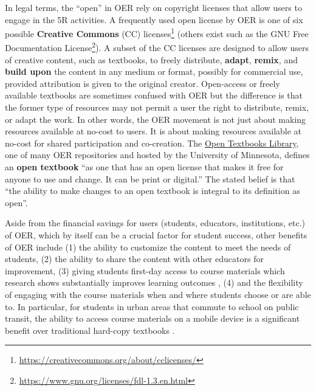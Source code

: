\documentclass[11pt]{article}
\begin{document}
In legal terms, the ``open'' in OER rely on copyright licenses that allow users to engage in the 5R activities.  A frequently used open license by OER is one of six possible \textbf{Creative Commons} (CC) licenses\footnote{\href{https://creativecommons.org/about/cclicenses/}{https://creativecommons.org/about/cclicenses/}} (others exist such as the GNU Free Documentation License\footnote{\href{https://www.gnu.org/licenses/fdl-1.3.en.html}{https://www.gnu.org/licenses/fdl-1.3.en.html}}).  A subset of the CC licenses are designed to allow users of creative content, such as textbooks, to freely distribute, \textbf{adapt}, \textbf{remix}, and \textbf{build upon} the content in any medium or format, possibly for commercial use, provided attribution is given to the original creator.  Open-access or freely available textbooks are sometimes confused with OER but the difference is that the former type of resources may not permit a user the right to distribute, remix, or adapt the work.  In other words, the OER movement is not just about making resources available at no-cost to users.  It is about making resources available at no-cost for shared participation and co-creation.  The \href{open.umn.edu/opentextbooks/faq}{Open Textbooks Library}, one of many OER repositories and hosted by the University of Minnesota, defines an \textbf{open textbook} ``as one that has an open license that makes it free for anyone to use and change. It can be print or digital.''  The stated belief is that ``the ability to make changes to an open textbook is integral to its definition as open''.

Aside from the financial savings for users (students, educators, institutions, etc.) of OER, which by itself can be a crucial factor for student success, other benefits of OER include (1) the ability to customize the content to meet the needs of students, (2) the ability to share the content with other educators for improvement, (3) giving students first-day access to course materials which research shows substantially improves learning outcomes \cite{LA:2017}, (4) and the flexibility of engaging with the course materials when and where students choose or are able to.  In particular, for students in urban areas that commute to school on public transit, the ability to access course materials on a mobile device is a significant benefit over traditional hard-copy textbooks \cite{CC:17, MS:14}.
\end{document}

